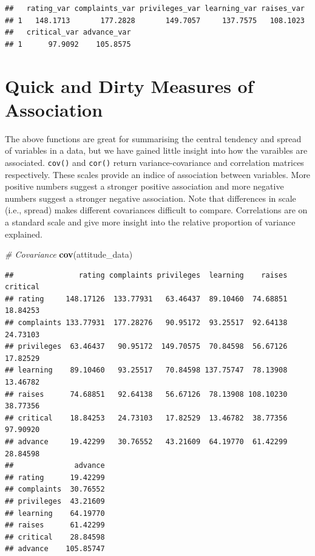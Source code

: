 \documentclass[]{book}
\newenvironment{Shaded}{\begin{snugshade}}{\end{snugshade}}
\newcommand{\CommentTok}[1]{\textcolor[rgb]{0.56,0.35,0.01}{\textit{#1}}}
\newcommand{\KeywordTok}[1]{\textcolor[rgb]{0.13,0.29,0.53}{\textbf{#1}}}
\newcommand{\NormalTok}[1]{#1}
\theoremstyle{definition}
\theoremstyle{definition}
\theoremstyle{definition}
\theoremstyle{remark}
\begin{document}
\begin{verbatim}
##   rating_var complaints_var privileges_var learning_var raises_var
## 1   148.1713       177.2828       149.7057     137.7575   108.1023
##   critical_var advance_var
## 1      97.9092    105.8575
\end{verbatim}

\hypertarget{quick-and-dirty-measures-of-association}{%
\section{Quick and Dirty Measures of Association}\label{quick-and-dirty-measures-of-association}}

The above functions are great for summarising the central tendency and spread of variables in a data, but we have gained little insight into how the varaibles are associated. \texttt{cov()} and \texttt{cor()} return variance-covariance and correlation matrices respectively. These scales provide an indice of association between variables. More positive numbers suggest a stronger positive association and more negative numbers suggest a stronger negative association. Note that differences in scale (i.e., spread) makes different covariances difficult to compare. Correlations are on a standard scale and give more insight into the relative proportion of variance explained.

\begin{Shaded}
\begin{Highlighting}[]
\CommentTok{# Covariance}
\KeywordTok{cov}\NormalTok{(attitude_data)}
\end{Highlighting}
\end{Shaded}

\begin{verbatim}
##               rating complaints privileges  learning    raises critical
## rating     148.17126  133.77931   63.46437  89.10460  74.68851 18.84253
## complaints 133.77931  177.28276   90.95172  93.25517  92.64138 24.73103
## privileges  63.46437   90.95172  149.70575  70.84598  56.67126 17.82529
## learning    89.10460   93.25517   70.84598 137.75747  78.13908 13.46782
## raises      74.68851   92.64138   56.67126  78.13908 108.10230 38.77356
## critical    18.84253   24.73103   17.82529  13.46782  38.77356 97.90920
## advance     19.42299   30.76552   43.21609  64.19770  61.42299 28.84598
##              advance
## rating      19.42299
## complaints  30.76552
## privileges  43.21609
## learning    64.19770
## raises      61.42299
## critical    28.84598
## advance    105.85747
\end{verbatim}
\end{document}
